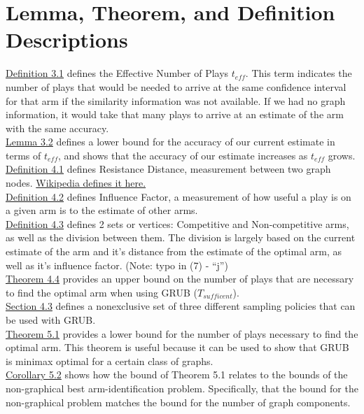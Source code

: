 \documentclass{article}[12pt]
\begin{document}
\section{Lemma, Theorem, and Definition Descriptions}

\underline{Definition 3.1} defines the Effective Number of Plays $t_{eff}$.
This term indicates the number of plays that would be needed to arrive at the same confidence interval for that arm if the similarity information was not available.
If we had no graph information, it would take that many plays to arrive at an estimate of the arm with the same accuracy. \\

\underline{Lemma 3.2} defines a lower bound for the accuracy of our current estimate in terms of $t_{eff}$,
and shows that the accuracy of our estimate increases as $t_{eff}$ grows. \\

\underline{Definition 4.1} defines Resistance Distance, measurement between two graph nodes.
\href{https://en.wikipedia.org/wiki/Resistance_distance}{Wikipedia defines it here.} \\

\underline{Definition 4.2} defines Influence Factor, a measurement of how useful a play is on a given arm is to the estimate of other arms. \\


\underline{Definition 4.3} defines 2 sets or vertices: Competitive and Non-competitive arms, as well as the division between them.
The division is largely based on the current estimate of the arm and it’s distance from the estimate of the optimal arm, as well as it’s influence factor.
(Note: typo in (7) - “j”) \\

\underline{Theorem 4.4} provides an upper bound on the number of plays that are necessary to find the optimal arm when using GRUB ($T_{sufficent}$). \\

\underline{Section 4.3} defines a nonexclusive set of three different sampling policies that can be used with GRUB. \\

\underline{Theorem 5.1} provides a lower bound for the number of plays necessary to find the optimal arm.
This theorem is useful because it can be used to show that GRUB is minimax optimal for a certain class of graphs. \\

\underline{Corollary 5.2} shows how the bound of Theorem 5.1 relates to the bounds of the non-graphical best arm-identification problem.
Specifically, that the bound for the non-graphical problem matches the bound for the number of graph components. \\
\end{document}
